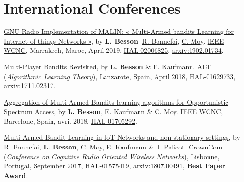 \section*{International Conferences}
\renewcommand{\labelenumi}{[IC-\arabic{enumi}]}
\begin{etaremune}
\item
  \href{https://perso.crans.org/besson/articles/BBM__IEEE_WCNC_2019.pdf}{GNU
  Radio Implementation of MALIN: « Multi-Armed bandits Learning for
  Internet-of-things Networks »}, by \textbf{L. Besson},
  \href{https://remibonnefoi.wordpress.com/}{R. Bonnefoi},
  \href{https://moychris.wordpress.com/}{C. Moy}.
  \href{http://wcnc2019.ieee-wcnc.org/}{IEEE WCNC},
  Marrakech, Maroc, April 2019,
  \href{https://hal.inria.fr/hal-02006825}{HAL-02006825},
  \href{https://arxiv.org/abs/1902.01734}{arxiv:1902.01734}.
  \cite{Besson2019WCNC}
\item
  \href{https://hal.inria.fr/hal-01629733/document}{Multi-Player Bandits
  Revisited}, by \textbf{L. Besson} \&
  \href{http://chercheurs.lille.inria.fr/ekaufman/research.html}{E.
  Kaufmann}.
  \href{http://www.cs.cornell.edu/conferences/alt2018/accepted.html}{ALT}
  (\emph{Algorithmic Learning Theory}), Lanzarote, Spain, April 2018,
  \href{https://hal.inria.fr/hal-01629733}{HAL-01629733},
  \href{https://arxiv.org/abs/1711.02317}{arxiv:1711.02317}.
  \cite{Besson2018ALT}
\item
  \href{https://hal.inria.fr/hal-01705292/document}{Aggregation of
  Multi-Armed Bandits learning algorithms for Opportunistic Spectrum
  Access}, by \textbf{L. Besson},
  \href{http://chercheurs.lille.inria.fr/ekaufman/research.html}{E.
  Kaufmann} \& \href{https://moychris.wordpress.com/}{C. Moy}.
  \href{http://wcnc2018.ieee-wcnc.org/}{IEEE WCNC}, Barcelone, Spain,
  avril 2018, \href{https://hal.inria.fr/hal-01705292}{HAL-01705292}.
  \cite{Besson2018WCNC}
\item
  \href{https://hal.inria.fr/hal-01575419/document}{Multi-Armed Bandit
  Learning in IoT Networks and non-stationary settings}, by
  \href{https://remibonnefoi.wordpress.com/}{R. Bonnefoi}, \textbf{L.
  Besson}, \href{https://moychris.wordpress.com/}{C. Moy},
  \href{http://chercheurs.lille.inria.fr/ekaufman/research.html}{E.
  Kaufmann} \& J. Palicot. \href{http://crowncom.org/2017/}{CrownCom}
  (\emph{Conference on Cognitive Radio Oriented Wireless Networks}),
  Lisbonne, Portugal, September 2017,
  \href{https://hal.inria.fr/hal-01575419}{HAL-01575419},
  \href{https://arxiv.org/abs/1807.00491}{arxiv:1807.00491},
  \textbf{Best Paper Award}.
  \cite{Bonnefoi17}
\end{etaremune}


